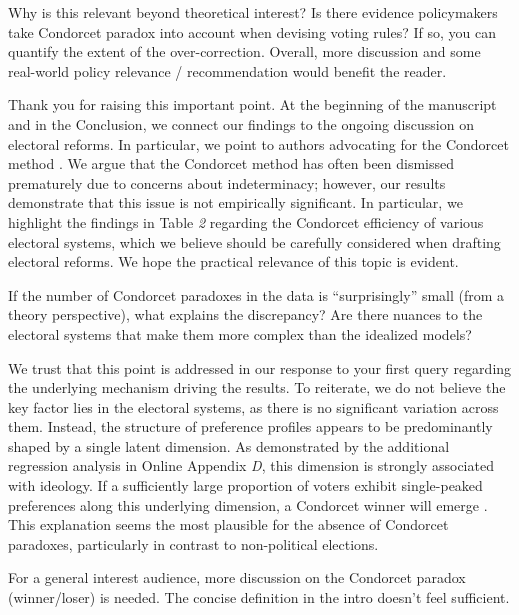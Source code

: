 \documentclass[a4paper, 12pt]{scrartcl}
\theoremstyle{break}
\newenvironment{changes}{\par\color{violet}\par\addvspace{\baselineskip}}{\par\addvspace{\baselineskip}}
\begin{document}
\begin{changes}
Why is this relevant beyond theoretical interest? Is there evidence policymakers take Condorcet paradox into account when devising voting rules? If so, you can quantify the extent of the over-correction. Overall, more discussion and some real-world policy relevance / recommendation would benefit the reader.
\end{changes}

Thank you for raising this important point. At the beginning of the manuscript and in the Conclusion, we connect our findings to the ongoing discussion on electoral reforms. In particular, we point to authors advocating for the Condorcet method \citep{Maskin2016, Maskin2017, Maskin2017a}. We argue that the Condorcet method has often been dismissed prematurely due to concerns about indeterminacy; however, our results demonstrate that this issue is not empirically significant. In particular, we highlight the findings in Table \textit{2} regarding the Condorcet efficiency of various electoral systems, which we believe should be carefully considered when drafting electoral reforms. We hope the practical relevance of this topic is evident.

\begin{changes}
If the number of Condorcet paradoxes in the data is ``surprisingly'' small (from a theory perspective), what explains the discrepancy? Are there nuances to the electoral systems that make them more complex than the idealized models?
\end{changes}

We trust that this point is addressed in our response to your first query regarding the underlying mechanism driving the results. To reiterate, we do not believe the key factor lies in the electoral systems, as there is no significant variation across them. Instead, the structure of preference profiles appears to be predominantly shaped by a single latent dimension. As demonstrated by the additional regression analysis in Online Appendix \textit{D}, this dimension is strongly associated with ideology. If a sufficiently large proportion of voters exhibit single-peaked preferences along this underlying dimension, a Condorcet winner will emerge \citep{Black1958}. This explanation seems the most plausible for the absence of Condorcet paradoxes, particularly in contrast to non-political elections.

\begin{changes}
For a general interest audience, more discussion on the Condorcet paradox (winner/loser) is needed. The concise definition in the intro doesn’t feel sufficient.
\end{changes}
\end{document}
